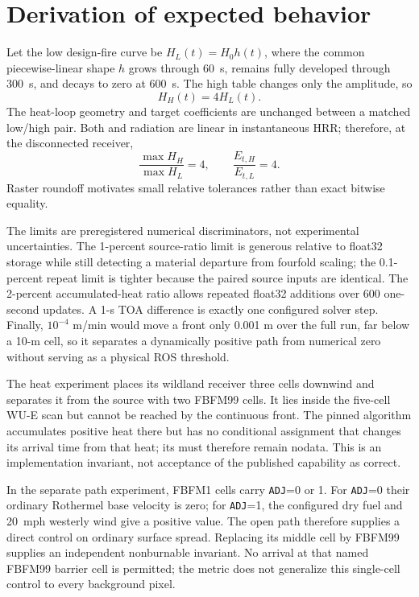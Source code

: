 \section{Derivation of expected behavior}
Let the low design-fire curve be $H_L(t)=H_0h(t)$, where the common
piecewise-linear shape $h$ grows through \SI{60}{s}, remains fully developed
through \SI{300}{s}, and decays to zero at \SI{600}{s}.  The high table changes
only the amplitude, so
\begin{equation}H_H(t)=4H_L(t).
\end{equation}
The heat-loop geometry and target coefficients are unchanged between a matched
low/high pair.  Both \DFC{} and radiation are linear in instantaneous HRR;
therefore, at the disconnected receiver,
\begin{equation}
 \frac{\max H_H}{\max H_L}=4,
 \qquad \frac{E_{t,H}}{E_{t,L}}=4.
\end{equation}
Raster roundoff motivates small relative tolerances rather than exact bitwise
equality.

The limits are preregistered numerical discriminators, not experimental
uncertainties.  The 1-percent source-ratio limit is generous relative to
float32 storage while still detecting a material departure from fourfold
scaling; the 0.1-percent repeat limit is tighter because the paired source
inputs are identical.  The 2-percent accumulated-heat ratio allows repeated
float32 additions over 600 one-second updates.  A 1-s TOA difference is exactly
one configured solver step.  Finally, $10^{-4}$ m/min would move a front only
0.001 m over the full run, far below a 10-m cell, so it separates a dynamically
positive path from numerical zero without serving as a physical ROS threshold.

The heat experiment places its wildland receiver three cells downwind and
separates it from the source with two FBFM99 cells.  It lies inside the
five-cell WU-E scan but cannot be reached by the continuous front.  The pinned
algorithm accumulates positive heat there but has no conditional assignment
that changes its arrival time from that heat; its \TOA{} must therefore remain
nodata.  This is an implementation invariant, not acceptance of the published
capability as correct.

In the separate path experiment, FBFM1 cells carry \texttt{ADJ}=0 or 1.
For \texttt{ADJ}=0 their ordinary Rothermel base velocity is zero; for
\texttt{ADJ}=1, the configured dry fuel and \SI{20}{mph} westerly wind give a
positive value.  The open path therefore supplies a direct control on ordinary
surface spread.  Replacing its middle cell by FBFM99 supplies an independent
nonburnable invariant.  No arrival at that named FBFM99 barrier cell is
permitted; the metric does not generalize this single-cell control to every
background pixel.

